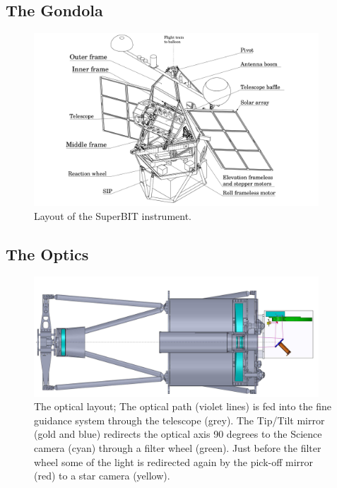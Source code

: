 \subsection{The Gondola}
\begin{figure}
    \begin{small}
        \begin{center}
            \includegraphics[width=0.95\textwidth]{Introduction/figs/bit_model.png}
        \end{center}
        \caption{Layout of the SuperBIT instrument.}
        \label{fig:bit}
    \end{small}
\end{figure}


\subsection{The Optics}

\begin{figure}
    \begin{small}
        \begin{center}
            \includegraphics[width=0.95\textwidth]{Introduction/figs/optical_path.png}
        \end{center}
        \caption{The optical layout; The optical path (violet lines) is fed into the fine guidance system through the telescope (grey). The Tip/Tilt mirror (gold and blue) redirects the optical axis 90 degrees to the Science camera (cyan) through a filter wheel (green). Just before the filter wheel some of the light is redirected again by the pick-off mirror (red) to a star camera (yellow).}
        \label{fig:optics}
    \end{small}
\end{figure}

